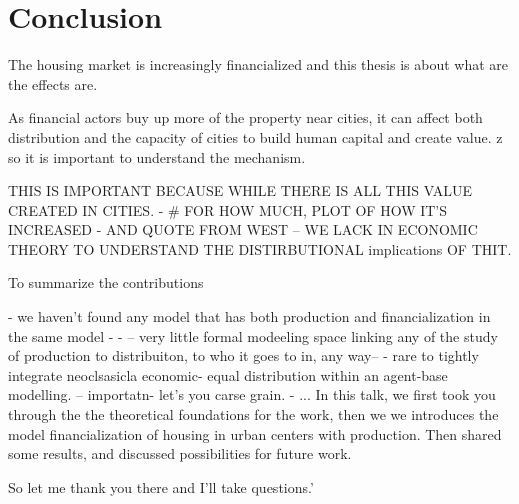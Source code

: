\section{Conclusion}


The housing market is increasingly financialized and this thesis is about what are the effects are. 

As financial actors buy up more of the property near cities, it can affect both distribution and the capacity of cities to build human capital and create value. z
so it is important to understand the mechanism.

THIS IS IMPORTANT BECAUSE WHILE THERE IS ALL THIS VALUE CREATED IN CITIES. - # FOR HOW MUCH, PLOT OF HOW IT'S INCREASED - AND QUOTE FROM WEST -- WE LACK IN ECONOMIC THEORY TO UNDERSTAND THE DISTIRBUTIONAL implications OF THIT.

To summarize the contributions

- we haven't found any model that has both production and financialization in the same model - 
- -- very little formal modeeling space linking any of the study of production to distribuiton, to who it goes to in, any way-- 
- rare to tightly integrate neoclsasicla economic- equal distribution within an agent-base modelling. -- importatn- let's you carse grain.
- ...
In this talk, we first took you through the the theoretical foundations for the work, then we we introduces the model financialization of housing in urban centers with production. Then shared some results, and  discussed possibilities for future work. 

So let me thank you there and I'll take questions.'

